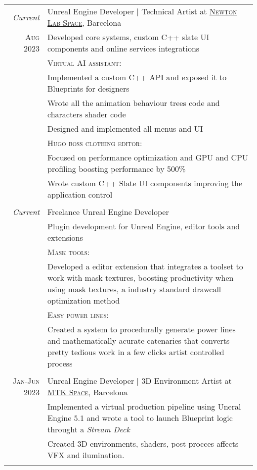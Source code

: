 \documentclass[a4paper,10pt]{article} %
\begin{document}
\begin{tabular}{r|p{11cm}}
\emph{Current} &  Unreal Engine Developer | Technical Artist at \href{https://www.newtonlabspace.com}{\textsc{Newton Lab Space}}, Barcelona \\
\textsc{Aug 2023} & \footnotesize{Developed core systems, custom C++ slate UI components and online services integrations}\\
& \textsc{Virtual AI assistant}: \\
& \footnotesize{Implemented a custom C++ API and exposed it to Blueprints for designers}\\
& \footnotesize{Wrote all the animation behaviour trees code and characters shader code}\\
& \footnotesize{Designed and implemented all menus and UI}\\
& \textsc{Hugo boss clothing editor}: \\
& \footnotesize{Focused on performance optimization and GPU and CPU profiling boosting performance by 500\%}\\
& \footnotesize{Wrote custom C++ Slate UI components improving the application control}\\
\multicolumn{2}{c}{} \\


\emph{Current} & Freelance Unreal Engine Developer \\
& \footnotesize{Plugin development for Unreal Engine, editor tools and extensions}\\
& \textsc{Mask tools}: \\
& \footnotesize{Developed a editor extension that integrates a toolset to work with mask textures, boosting productivity when using mask textures, a industry standard drawcall optimization method}\\
& \textsc{Easy power lines}: \\
& \footnotesize{Created a system to procedurally generate power lines and mathematically acurate catenaries that converts pretty tedious work in a few clicks artist controlled process}\\
\multicolumn{2}{c}{} \\

\textsc{Jan-Jun 2023} & Unreal Engine Developer | 3D Environment Artist at \href{https://mtkspace.com/home/}{\textsc{MTK Space}}, Barcelona \emph{}\\
& \footnotesize{Implemented a virtual production pipeline using Uneral Engine 5.1 and wrote a tool to launch Blueprint logic throught a \textit{Stream Deck}}\\
& \footnotesize{Created 3D environments, shaders, post procces affects VFX and ilumination.}\\
\multicolumn{2}{c}{} \\
\end{tabular}
\end{document}
